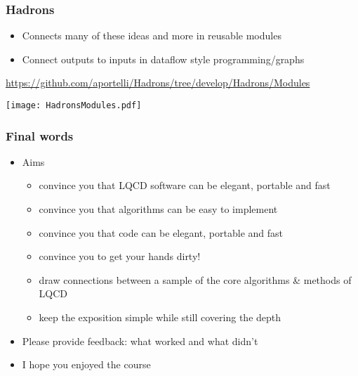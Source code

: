 \documentclass[pdf,ps,8pt]{beamer}
\newcommand{\link}[1]{\href{#1}{ {\color{blue} #1} }}
\begin{document}
\begin{frame}[fragile]\small\frametitle{ Hadrons}

  \begin{itemize}
  \item Connects many of these ideas and more in reusable modules
  \item Connect outputs to inputs in dataflow style programming/graphs
  \end{itemize}
\begin{center} \link{https://github.com/aportelli/Hadrons/tree/develop/Hadrons/Modules}\end{center}
\texttt{[image: HadronsModules.pdf]}
\end{frame}

\begin{frame}[fragile]\small\frametitle{ Final words }
  \begin{itemize}
  \item Aims
  \begin{itemize}
  \item convince you that LQCD software can be elegant, portable and fast
  \item convince you that algorithms can be easy to implement
  \item convince you that code can be elegant, portable and fast
  \item convince you to get your hands dirty!
  \item draw connections between a sample of the core algorithms \& methods of LQCD
  \item keep the exposition simple while still covering the depth
  \end{itemize}
  \item Please provide feedback: what worked and what didn't
  \item I hope you enjoyed the course
  \end{itemize}
\end{frame}
\end{document}
